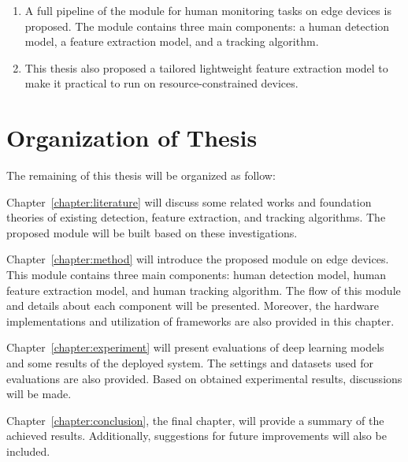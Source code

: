 \documentclass[../main.tex]{subfiles}
\begin{document}
\begin{enumerate}
\item A full pipeline of the module for human monitoring tasks on edge devices is proposed. The module contains three main components: a human detection model, a feature extraction model, and a tracking algorithm.
\item This thesis also proposed a tailored lightweight feature extraction model to make it practical to run on resource-constrained devices.
\end{enumerate}

\section{Organization of Thesis}
\label{sec:organize}
The remaining of this thesis will be organized as follow:

Chapter~\ref{chapter:literature} will discuss some related works and foundation theories of existing detection, feature extraction, and tracking algorithms. The proposed module will be built based on these investigations.

Chapter~\ref{chapter:method} will introduce the proposed module on edge devices. This module contains three main components: human detection model, human feature extraction model, and human tracking algorithm. The flow of this module and details about each component will be presented. Moreover, the hardware implementations and utilization of frameworks are also provided in this chapter.

Chapter~\ref{chapter:experiment} will present evaluations of deep learning models and some results of the deployed system. The settings and datasets used for evaluations are also provided. Based on obtained experimental results, discussions will be made.

Chapter~\ref{chapter:conclusion}, the final chapter, will provide a summary of the achieved results. Additionally, suggestions for future improvements will also be included.
\end{document}
